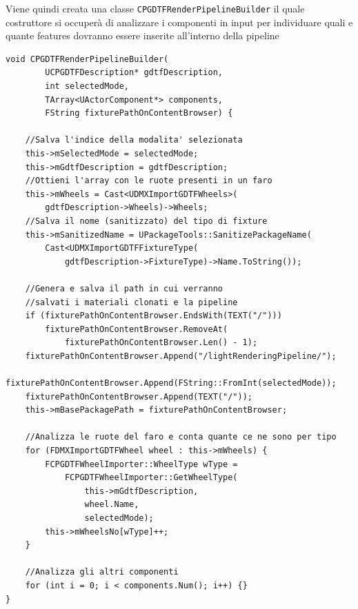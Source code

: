 \documentclass[main.tex]{subfiles}
\begin{document}
Viene quindi creata una classe \lstinline{CPGDTFRenderPipelineBuilder} il quale costruttore si occuperà di analizzare i componenti in input per individuare quali e quante features dovranno essere inserite all'interno della pipeline
\begin{lstlisting}
void CPGDTFRenderPipelineBuilder(
        UCPGDTFDescription* gdtfDescription,
        int selectedMode,
        TArray<UActorComponent*> components,
        FString fixturePathOnContentBrowser) {

    //Salva l'indice della modalita' selezionata
	this->mSelectedMode = selectedMode;
	this->mGdtfDescription = gdtfDescription;
	//Ottieni l'array con le ruote presenti in un faro
    this->mWheels = Cast<UDMXImportGDTFWheels>(
        gdtfDescription->Wheels)->Wheels;
    //Salva il nome (sanitizzato) del tipo di fixture
	this->mSanitizedName = UPackageTools::SanitizePackageName(
        Cast<UDMXImportGDTFFixtureType(
            gdtfDescription->FixtureType)->Name.ToString());

    //Genera e salva il path in cui verranno
    //salvati i materiali clonati e la pipeline
	if (fixturePathOnContentBrowser.EndsWith(TEXT("/")))
        fixturePathOnContentBrowser.RemoveAt(
            fixturePathOnContentBrowser.Len() - 1);
	fixturePathOnContentBrowser.Append("/lightRenderingPipeline/");
	fixturePathOnContentBrowser.Append(FString::FromInt(selectedMode));
	fixturePathOnContentBrowser.Append(TEXT("/"));
	this->mBasePackagePath = fixturePathOnContentBrowser;

    //Analizza le ruote del faro e conta quante ce ne sono per tipo
	for (FDMXImportGDTFWheel wheel : this->mWheels) {
		FCPGDTFWheelImporter::WheelType wType =
            FCPGDTFWheelImporter::GetWheelType(
                this->mGdtfDescription,
                wheel.Name,
                selectedMode);
		this->mWheelsNo[wType]++;
	}

    //Analizza gli altri componenti
	for (int i = 0; i < components.Num(); i++) {}
}
\end{lstlisting}
\end{document}
